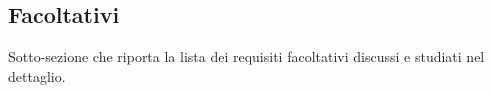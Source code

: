\subsection{Facoltativi}

Sotto-sezione che riporta la lista dei requisiti facoltativi discussi e studiati nel dettaglio.
